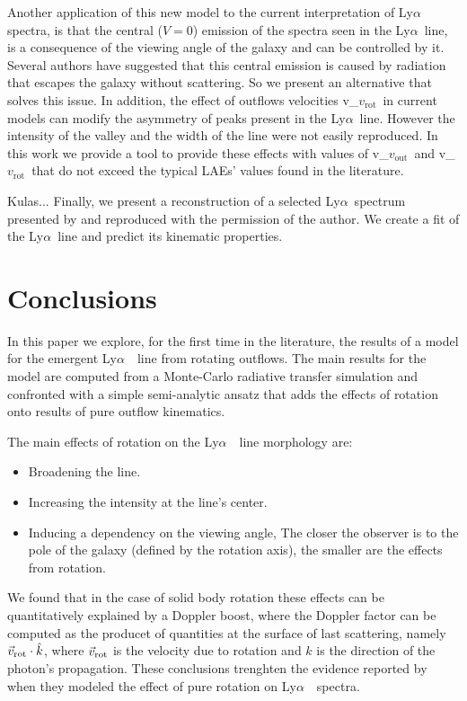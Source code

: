\documentclass[a4paper,fleqn,usenatbib]{mnras}
\newcommand{\lya}{\ifmmode{{\rm Ly}\alpha}\else Ly$\alpha$\ \fi}
\newcommand{\vrot}{\ifmmode\mathrm v_{\mathrm{rot}}\else $v_{\mathrm{rot}}$~\fi}
\newcommand{\vout}{\ifmmode\mathrm v_{\mathrm{out}}\else $v_{\mathrm{out}}$~\fi}
\begin{document}
Another application of this new model to the current interpretation of \lya
spectra, is that the central ($V=0$) emission of the spectra seen in the
\lya line, is a consequence of the viewing angle of the galaxy and can be
controlled by it. Several authors have suggested that this central emission
is caused by radiation that escapes the galaxy without scattering. So we
present an alternative that solves this issue. In addition, the effect of
outflows velocities \vrot in current models can modify the asymmetry of peaks
present in the \lya line. However the intensity of the valley and the width
of the line were not easily reproduced. In this work we provide a tool to
provide these effects with values of \vout and \vrot that do not exceed the
typical LAEs' values found in the literature.

\color{red}
Kulas...
\color{black}
Finally, we present a reconstruction of a selected \lya spectrum presented
by \cite{Kulas12} and reproduced with the permission of the author. We create
a fit of the \lya line and predict its kinematic properties.

\section{Conclusions}
\label{sec:conclusions}

In this paper we explore, for the first time in the literature,
the results of a model for the emergent \lya\ line from rotating outflows.
The main results for the model are computed from a Monte-Carlo radiative transfer
simulation and confronted with a simple semi-analytic ansatz that adds the effects
of rotation onto results of pure outflow kinematics.

The main effects of rotation on the \lya\ line morphology are:


\begin{itemize}
  \item Broadening the line.
	\item Increasing the intensity at the line's center.
	\item Inducing a dependency on the viewing angle,
  The closer the observer is to the pole of the galaxy (defined by the rotation axis),
  the smaller are the effects from rotation.
\end{itemize}

We found that in the case of solid body rotation these effects can be quantitatively
explained by a Doppler boost, where the Doppler factor can be computed as the
 producet of quantities at the surface of last scattering, namely $\vec{v}_{\rm rot}\cdot \hat{k}$,
 where $\vec{v}_{\rm rot}$ is the velocity due to rotation and $\hat{k}$ is the direction
 of the photon's propagation.
These conclusions trenghten the evidence reported by \cite{Garavito14} when they modeled
the effect of pure rotation on \lya\ spectra.
\end{document}
